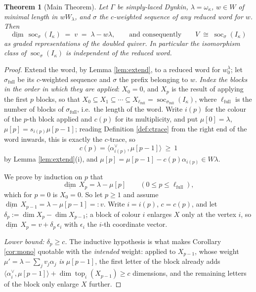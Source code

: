 \documentclass[reqno]{amsart}
\theoremstyle{plain}
\newtheorem{theorem}{Theorem}[section]
\theoremstyle{definition}
\DeclareMathOperator{\soc}{soc}
\DeclareMathOperator{\topp}{top}
\newcommand{\dimv}{\underline{\dim}\,}
\newcommand{\la}{\lambda}
\newcommand{\al}{\alpha}
\newcommand{\om}{\omega}
\newcommand{\ka}{\kappa}
\begin{document}
\begin{theorem}[Main Theorem]\label{thm:main}
Let $\Gamma$ be simply-laced Dynkin, $\la=\om_\ka$, $w\in W$ of minimal length
in $wW_\la$, and $\sigma$ the $c$-weighted sequence of any reduced word for
$w$.  Then
\[
   \dimv\soc_\sigma(I_\ka)\;=\;v\;=\;\la-w\la,
   \qquad\text{and consequently}\qquad
   V\;\cong\;\soc_\sigma(I_\ka)
\]
as graded representations of the doubled quiver.  In particular the
isomorphism class of $\soc_\sigma(I_\ka)$ is independent of the reduced word.
\end{theorem}

\begin{proof}
Extend the word, by Lemma \ref{lem:extend}, to a reduced word for $w_0^\la$;
let $\sigma_{\mathrm{full}}$ be its $c$-weighted sequence and $\sigma$ the
prefix belonging to $w$.  \emph{Index the blocks in the order in which they are
applied}: $X_0=0$, and $X_p$ is the result of applying the first $p$ blocks, so
that $X_0\subseteq X_1\subseteq\cdots\subseteq X_{\ell_{\mathrm{full}}}
=\soc_{\sigma_{\mathrm{full}}}(I_\ka)$, where $\ell_{\mathrm{full}}$ is the
number of blocks of $\sigma_{\mathrm{full}}$, i.e.\ the length of the word.
Write $i(p)$ for the colour of the $p$-th block applied and $c(p)$ for its
multiplicity, and put $\mu[0]=\la$, $\mu[p]=s_{i(p)}\mu[p-1]$; reading
Definition \ref{def:ctrace} from the right end of the word inwards, this is
exactly the $c$-trace, so
\[
   c(p)=\langle\al_{i(p)}^\vee,\mu[p-1]\rangle\ \ge\ 1
\]
by Lemma \ref{lem:extend}(i), and $\mu[p]=\mu[p-1]-c(p)\al_{i(p)}\in W\la$.

We prove by induction on $p$ that
\begin{equation}\label{eq:lower}
   \dimv X_p=\la-\mu[p]\qquad(0\le p\le \ell_{\mathrm{full}}),
\end{equation}
which for $p=0$ is $X_0=0$.  So let $p\ge1$ and assume
$\dimv X_{p-1}=\la-\mu[p-1]=:v$.  Write $i=i(p)$, $c=c(p)$, and let
$\delta_p:=\dim X_p-\dim X_{p-1}$; a block of colour $i$ enlarges $X$ only at
the vertex $i$, so $\dimv X_p=v+\delta_p\,\epsilon_i$ with $\epsilon_i$ the
$i$-th coordinate vector.

\emph{Lower bound: $\delta_p\ge c$.}  The inductive hypothesis is what makes
Corollary \ref{cor:mono} quotable with the \emph{intended} weight: applied to
$X_{p-1}$, whose weight $\mu'=\la-\sum_jv_j\al_j$ \emph{is} $\mu[p-1]$, the
first letter of the block already adds
$\langle\al_i^\vee,\mu[p-1]\rangle+\dim\topp_i(X_{p-1})\ge c$ dimensions, and
the remaining letters of the block only enlarge $X$ further.


\end{proof}
\end{document}
